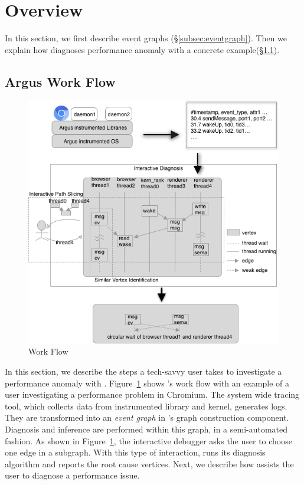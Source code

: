 \section{Overview}\label{sec:overview}

In this section, we first describe \xxx event graphs
(\S\ref{subsec:eventgraph}). Then we explain how \xxx diagnoses performance
anomaly with a concrete example(\S\ref{subsec:overflow}).



\subsection{Argus Work Flow} \label{subsec:overflow}

\begin{figure}[tb]
    \centering
	\includegraphics[width=\columnwidth]{./figures/Argus_overview.png}
    \caption{\xxx Work Flow}
    \label{fig:argus-overview}
\end{figure}

In this section, we describe the steps a tech-savvy user takes to investigate a
performance anomaly with \xxx.  Figure~\ref{fig:argus-overview} shows \xxx's
work flow with an example of a user investigating a performance problem in
Chromium.  The system wide tracing tool, which collects data from \xxx
instrumented library and kernel, generates logs. They are transformed into an
\emph{event graph} in \xxx's graph construction component. Diagnosis and
inference are performed within this graph, in a semi-automated fashion.  As
shown in Figure~\ref{fig:argus-overview}, the \xxx interactive debugger asks
the user to choose one edge in a subgraph. With this type of interaction, \xxx
runs its diagnosis algorithm and reports the root cause vertices.  Next, we
describe how \xxx assists the user to diagnose a performance issue.


